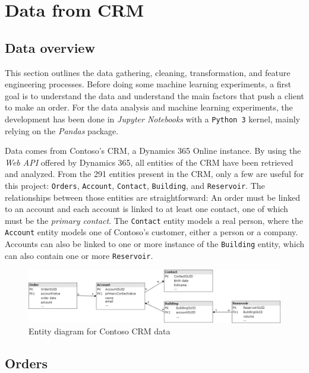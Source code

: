 \section{Data from CRM} \label{sec:crm-data}

\subsection{Data overview}
This section outlines the data gathering, cleaning, transformation, and feature engineering processes. Before doing some machine learning experiments, a first goal is to understand the data and understand the main factors that push a client to make an order. For the data analysis and machine learning experiments, the development has been done in \textit{Jupyter Notebooks} with a \texttt{Python 3} kernel, mainly relying on the \textit{Pandas} package.

Data comes from Contoso's CRM, a Dynamics 365 Online instance. By using the \textit{Web API} offered by Dynamics 365, all entities of the CRM have been retrieved and analyzed. From the 291 entities present in the CRM, only a few are useful for this project: \texttt{Orders}, \texttt{Account}, \texttt{Contact}, \texttt{Building}, and \texttt{Reservoir}. The relationships between those entities are straightforward: An order must be linked to an account and each account is linked to at least one contact, one of which must be the \textit{primary contact}. The \texttt{Contact} entity models a real person, where the \texttt{Account} entity models one of Contoso's customer, either a person or a company. Accounts can also be linked to one or more instance of the \texttt{Building} entity, which can also contain one or more \texttt{Reservoir}.

\begin{figure}[h]
    \centering
    \includegraphics[width=12cm]{images/entityDiagram.png}
    \caption[Entity diagram of the CRM data]{Entity diagram for Contoso CRM data}
    \label{fig:entity-diagram}
\end{figure}

\subsection{Orders}\label{sec:crm-orders}

